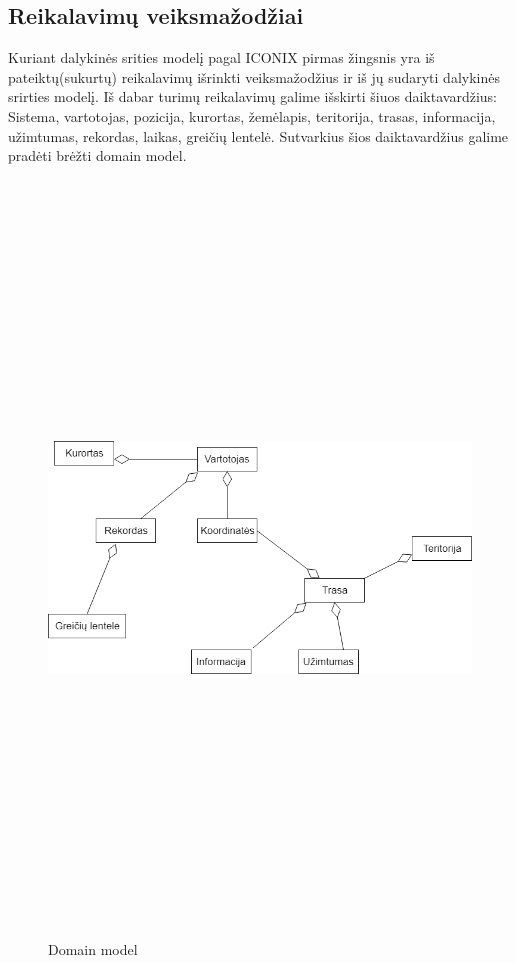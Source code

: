 \documentclass[oneside]{VUMIFPSkursinis}
\begin{document}
\subsection{Reikalavimų veiksmažodžiai}
	Kuriant dalykinės srities modelį pagal ICONIX pirmas žingsnis yra iš pateiktų(sukurtų) reikalavimų išrinkti veiksmažodžius ir iš jų sudaryti dalykinės srirties modelį. Iš  dabar turimų reikalavimų galime išskirti šiuos daiktavardžius:
	\newline
	\newline
	Sistema, vartotojas,  pozicija, kurortas, žemėlapis, teritorija, trasas, informacija, užimtumas, rekordas, laikas, greičių lentelė. 
	\newline
	\newline
	Sutvarkius šios daiktavardžius galime pradėti brėžti domain model. 
\begin{figure}[H]
		\centering	
	\includegraphics[width=18cm,height=20cm,keepaspectratio]{DomainModel.png}
	\caption{Domain model}
	\label{fig:Domain model}
\end{figure}
\end{document}
